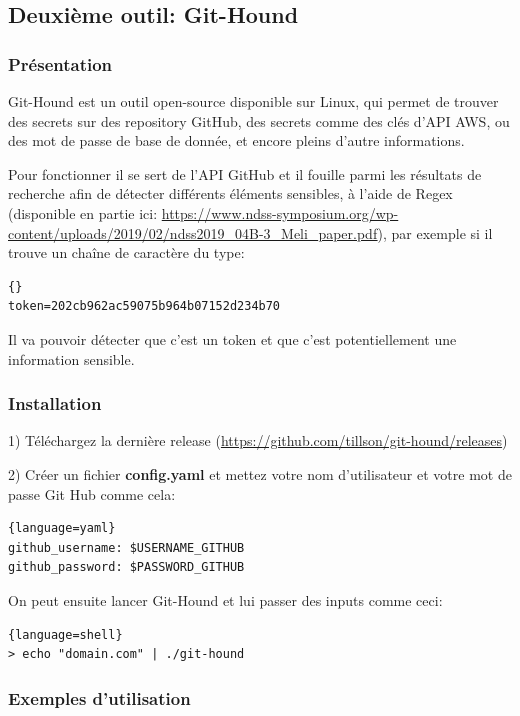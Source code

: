 \subsection{Deuxième outil: Git-Hound}

\subsubsection{Présentation}

Git-Hound est un outil open-source disponible sur Linux, qui permet de trouver des secrets sur des repository GitHub, des secrets comme des clés d'API AWS, 
ou des mot de passe de base de donnée, et encore pleins d'autre informations. 

Pour fonctionner il se sert de l'API GitHub et il fouille parmi les résultats de recherche afin de détecter 
différents éléments sensibles, à l'aide de Regex (disponible en partie ici: \url{https://www.ndss-symposium.org/wp-content/uploads/2019/02/ndss2019_04B-3_Meli_paper.pdf}), 
par exemple si il trouve un chaîne de caractère du type:

\begin{lstlisting}{}
token=202cb962ac59075b964b07152d234b70
\end{lstlisting}

Il va pouvoir détecter que c'est un token et que c'est potentiellement une information sensible.

\subsubsection{Installation}

1) Téléchargez la dernière release (\url{https://github.com/tillson/git-hound/releases})

2) Créer un fichier {\bfseries config.yaml} et mettez votre nom d'utilisateur et votre mot de passe Git Hub comme cela:

\begin{lstlisting}{language=yaml}
github_username: $USERNAME_GITHUB
github_password: $PASSWORD_GITHUB
\end{lstlisting}

On peut ensuite lancer Git-Hound et lui passer des inputs comme ceci:

\begin{lstlisting}{language=shell}
> echo "domain.com" | ./git-hound
\end{lstlisting}

\subsubsection{Exemples d'utilisation}

